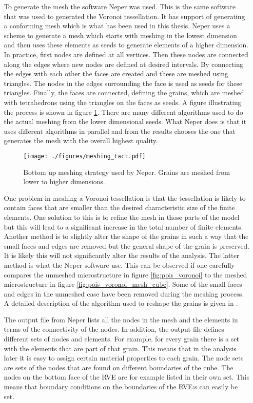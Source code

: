 \documentclass[meshing_micro.tex]{subfiles}
\begin{document}
To generate the mesh the software Neper\cite{Quey20111729} was used. 
This is the same software that was used to generated the Voronoi tessellation. It has support of generating a conforming mesh which is what has been used in this thesis. Neper uses a scheme to generate a mesh which starts with meshing in the lowest dimension and then uses these elements as seeds to generate elements of a higher dimension.  In practice, first nodes are defined at all vertices. Then these nodes are connected along the edges where new nodes are defined at desired intervals. 
By connecting the edges with each other the faces are created and these are meshed using triangles. The nodes in the edges surrounding the face is used as seeds for these triangles. Finally, the faces are connected, defining the grains, which are meshed with tetrahedrons using the triangles on the faces as seeds. A figure illustrating the process is shown in figure \ref{fig:mesh_strat}. There are many different algorithms used to do the actual meshing from the lower dimensional seeds. 
What Neper does is that it uses different algorithms in parallel and from the results chooses the one that generates the mesh with the overall highest quality.

 \begin{figure}[htpb!]
\centering
  \texttt{[image: ./figures/meshing\_tact.pdf]}
\caption{Bottom up meshing strategy used by Neper. Grains are meshed from lower to higher dimensions.}
\label{fig:mesh_strat}
\end{figure}


One problem in meshing a Voronoi tessellation is that the tessellation is likely to contain faces that are smaller than the desired characteristic size of the finite elements. One solution to this is to refine the mesh in those parts of the model but this will lead to a significant increase in the total number of finite elements.  Another method is to slightly alter the shape of the grains in such a way that the small faces and edges are removed but the general shape of the grain is preserved. It is likely this will not significantly alter the results of the analysis. The latter method is what the Neper software use. This can be observed if one carefully compares the unmeshed microstructure in figure \ref{fig:pois_voronoi} to the meshed microstructure in figure \ref{fig:pois_voronoi_mesh_cube}. Some of the small faces and edges in the unmeshed case have been removed during the meshing process. A detailed description of the algorithm used to reshape the grains is given in \cite{Quey20111729}.
 
The output file from Neper lists all the nodes in the mesh and the elements in terms of the connectivity of the nodes. In addition, the output file defines different sets of nodes and elements. For example, for every grain there is a set with the elements that are part of that grain. This means that in the analysis later it is easy to assign certain material properties to each grain. The node sets are sets of the nodes that are found on different boundaries of the cube. The nodes on the bottom face of the RVE are for example listed in their own set. This means that boundary conditions on the boundaries of the RVE:s can easily be set.
\end{document}
